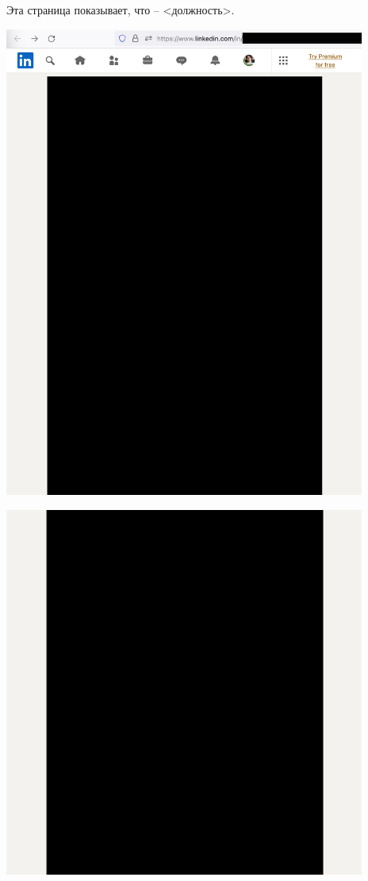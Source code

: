 
Эта страница показывает, что \MrAkvelon -- <должность>.

\begin{center}
    \includegraphics[width=32em]{akvelon-linkedin-p1_public}
\end{center}
\WillContinue
\pagebreak

\Continuing
\begin{center}
    \includegraphics[width=32em]{akvelon-linkedin-p2_public}
\end{center}

\pagebreak
